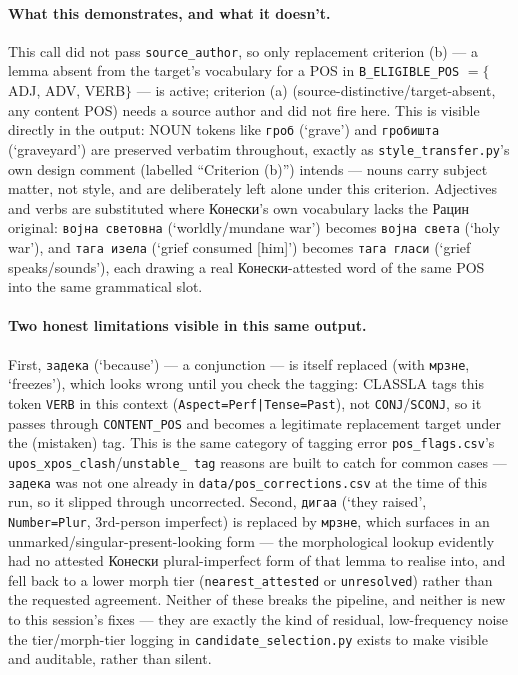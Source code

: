 \documentclass[11pt]{article}
\begin{document}
\paragraph{What this demonstrates, and what it doesn't.} This call did not
pass \texttt{source\_author}, so only replacement criterion (b) — a lemma
absent from the target's vocabulary for a POS in
\texttt{B\_ELIGIBLE\_POS} $=\{$ADJ, ADV, VERB$\}$ — is active; criterion (a)
(source-distinctive/target-absent, any content POS) needs a source author
and did not fire here. This is visible directly in the output: NOUN tokens
like \texttt{гроб} (`grave') and \texttt{гробишта} (`graveyard') are
preserved verbatim throughout, exactly as \texttt{style\_transfer.py}'s own
design comment (labelled ``Criterion (b)'') intends — nouns carry subject
matter, not style, and are deliberately left alone under this criterion. Adjectives and verbs are substituted where
Конески's own vocabulary lacks the Рацин original: \texttt{војна
световна} (`worldly/mundane war') becomes \texttt{војна света} (`holy
war'), and \texttt{тага изела} (`grief consumed [him]') becomes
\texttt{тага гласи} (`grief speaks/sounds'), each drawing a real
Конески-attested word of the same POS into the same grammatical slot.

\paragraph{Two honest limitations visible in this same output.} First,
\texttt{задека} (`because') — a conjunction — is itself replaced (with
\texttt{мрзне}, `freezes'), which looks wrong until you check the tagging:
CLASSLA tags this token \texttt{VERB} in this context
(\texttt{Aspect=Perf|Tense=Past}), not \texttt{CONJ}/\texttt{SCONJ}, so it
passes through \texttt{CONTENT\_POS} and becomes a legitimate replacement
target under the (mistaken) tag. This is the same category of tagging
error \texttt{pos\_flags.csv}'s \texttt{upos\_xpos\_clash}/\texttt{unstable\_
tag} reasons are built to catch for common cases — \texttt{задека} was not
one already in \texttt{data/pos\_corrections.csv} at the time of this run,
so it slipped through uncorrected. Second, \texttt{дигаа} (`they raised',
\texttt{Number=Plur}, 3rd-person imperfect) is replaced by \texttt{мрзне},
which surfaces in an unmarked/singular-present-looking form — the
morphological lookup evidently had no attested Конески plural-imperfect
form of that lemma to realise into, and fell back to a lower morph tier
(\texttt{nearest\_attested} or \texttt{unresolved}) rather than the
requested agreement. Neither of these breaks the pipeline, and neither is
new to this session's fixes — they are exactly the kind of residual,
low-frequency noise the tier/morph-tier logging in
\texttt{candidate\_selection.py} exists to make visible and auditable,
rather than silent.
\end{document}
